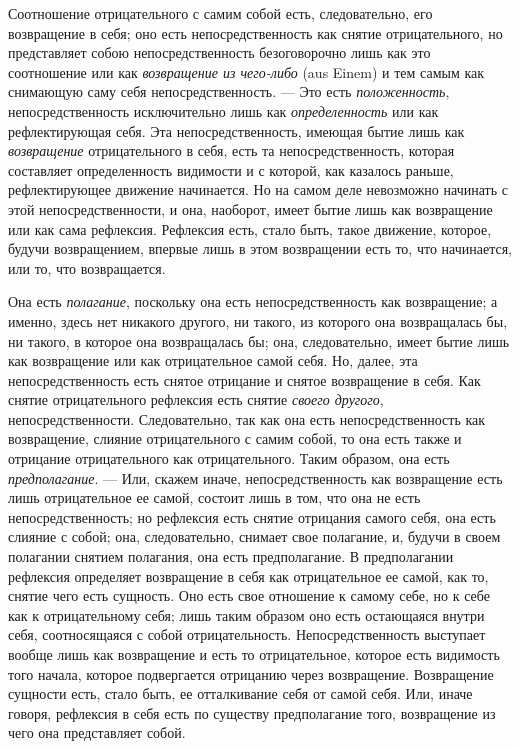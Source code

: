 Соотношение отрицательного с самим собой есть, следовательно, его
возвращение в себя; оно есть непосредственность как снятие отрицательного,
но представляет собою непосредственность безоговорочно лишь как это
соотношение или как {\em возвращение из чего-либо} (aus
Einem) и тем самым как снимающую саму себя непосредственность. --- Это есть
{\em положенность}, непосредственность исключительно
лишь как {\em определенность} или как рефлектирующая
себя. Эта непосредственность, имеющая бытие лишь как
{\em возвращение} отрицательного в себя, есть та
непосредственность, которая составляет определенность видимости и с
которой, как казалось раньше, рефлектирующее движение начинается. Но на
самом деле невозможно начинать с этой непосредственности, и она, наоборот,
имеет бытие лишь как возвращение или как сама рефлексия. Рефлексия есть,
стало быть, такое движение, которое, будучи возвращением, впервые лишь в
этом возвращении есть то, что начинается, или то, что возвращается.

Она есть {\em полагание}, поскольку она есть
непосредственность как возвращение; а именно, здесь нет никакого другого,
ни такого, из которого она возвращалась бы, ни такого, в которое она
возвращалась бы; она, следовательно, имеет бытие лишь как возвращение или
как отрицательное самой себя. Но, далее, эта непосредственность есть снятое
отрицание и снятое возвращение в себя. Как снятие отрицательного рефлексия
есть снятие {\em своего другого}, непосредственности.
Следовательно, так как она есть непосредственность как возвращение, слияние
отрицательного с самим собой, то она есть также и отрицание отрицательного
как отрицательного. Таким образом, она есть
{\em предполагание}. --- Или, скажем иначе,
непосредственность как возвращение есть лишь отрицательное ее самой,
состоит лишь в том, что она не есть непосредственность; но рефлексия есть
снятие отрицания самого себя, она есть слияние с собой; она, следовательно,
снимает свое полагание, и, будучи в своем полагании снятием полагания, она
есть предполагание. В предполагании рефлексия определяет возвращение в себя
как отрицательное ее самой, как то, снятие чего есть сущность. Оно есть
свое отношение к самому себе, но к себе как к отрицательному себя; лишь
таким образом оно есть остающаяся внутри себя, соотносящаяся с собой
отрицательность. Непосредственность выступает вообще лишь как возвращение и
есть то отрицательное, которое есть видимость того начала, которое
подвергается отрицанию через возвращение. Возвращение сущности есть, стало
быть, ее отталкивание себя от самой себя. Или, иначе говоря, рефлексия в
себя есть по существу предполагание того, возвращение из чего она
представляет собой.

